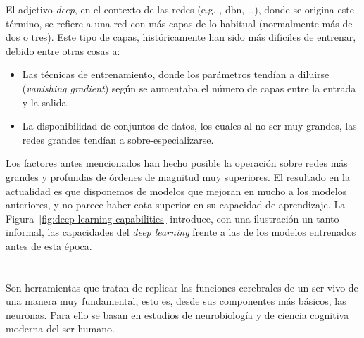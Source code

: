 El adjetivo \textit{deep}, en el contexto de las redes (e.g. , \gls{dbn}, \ldots), donde se origina este término, se refiere a una red con más capas de lo habitual (normalmente más de dos o tres). Este tipo de capas, históricamente han sido más difíciles de entrenar, debido entre otras cosas a:

\begin{itemize}
	\item Las técnicas de entrenamiento, donde los parámetros tendían a diluirse (\textit{vanishing gradient}) según se aumentaba el número de capas entre la entrada y la salida.
	\item La disponibilidad de conjuntos de datos, los cuales al no ser muy grandes, las redes grandes tendían a sobre-especializarse.
\end{itemize}

Los factores antes mencionados han hecho posible la operación sobre redes más grandes y profundas de órdenes de magnitud muy superiores. El resultado en la actualidad es que disponemos de modelos que mejoran en mucho a los modelos anteriores, y no parece haber cota superior en su capacidad de aprendizaje. La Figura~\ref{fig:deep-learning-capabilities} introduce, con una ilustración un tanto informal, las capacidades del \textit{deep learning} frente a las de los modelos entrenados antes de esta época.

\section{}

Son herramientas que tratan de replicar las funciones cerebrales de un ser vivo de una manera muy fundamental, esto es, desde sus componentes más básicos, las neuronas. Para ello se basan en estudios de neurobiología y de ciencia cognitiva moderna del ser humano.

